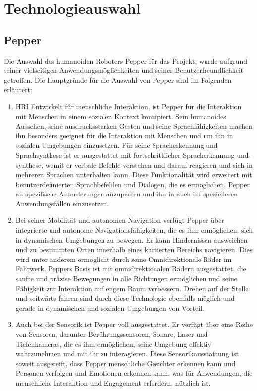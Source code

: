 \chapter{Technologieauswahl}
\section{Pepper}
Die Auswahl des humanoiden Roboters Pepper für das Projekt, wurde aufgrund seiner vielseitigen Anwendungsmöglichkeiten und seiner Benutzerfreundlichkeit getroffen. Die Hauptgründe für die Auswahl von Pepper sind im Folgenden erläutert:
\begin{enumerate}
    \item \ac{HRI} Entwickelt für menschliche Interaktion, ist Pepper für die Interaktion mit Menschen in einem sozialen Kontext konzipiert. Sein humanoides Aussehen, seine ausdrucksstarken Gesten und seine Sprachfähigkeiten machen ihn besonders geeignet für die Interaktion mit Menschen und um ihn in sozialen Umgebungen einzusetzen. Für seine Spracherkennung und Sprachsynthese ist er ausgestattet mit fortschrittlicher Spracherkennung und -synthese, womit er verbale Befehle verstehen und darauf reagieren und sich in mehreren Sprachen unterhalten kann. Diese Funktionalität wird erweitert mit benutzerdefinierten Sprachbefehlen und Dialogen, die es ermöglichen, Pepper an spezifische Anforderungen anzupassen und ihn in auch inf spezielleren Anwendungsfällen einzusetzen.
    \item Bei seiner Mobilität und autonomen Navigation verfügt Pepper über integrierte und autonome Navigationsfähigkeiten, die es ihm ermöglichen, sich in dynamischen Umgebungen zu bewegen. Er kann Hindernissen ausweichen und zu bestimmten Orten innerhalb eines kartierten Bereichs navigieren. Dies wird unter anderem ermöglicht durch seine Omnidirektionale Räder im Fahrwerk. Peppers Basis ist mit omnidirektionalen Rädern ausgestattet, die sanfte und präzise Bewegungen in alle Richtungen ermöglichen und seine Fähigkeit zur Interaktion auf engem Raum verbessern. Drehen auf der Stelle und seitwärts fahren sind durch diese Technologie ebenfalls möglich und gerade in dynamischen und sozialen Umgebungen von Vorteil.
    \item Auch bei der Sensorik ist Pepper voll ausgestattet. Er verfügt über eine Reihe von Sensoren, darunter Berührungssensoren, Sonare, Laser und Tiefenkameras, die es ihm ermöglichen, seine Umgebung effektiv wahrzunehmen und mit ihr zu interagieren. Diese Sensorikausstattung ist soweit ausgereift, dass Pepper menschliche Gesichter erkennen kann und Personen verfolgen und Emotionen erkennen kann, was für Anwendungen, die menschliche Interaktion und Engagement erfordern, nützlich ist.

\end{enumerate}
